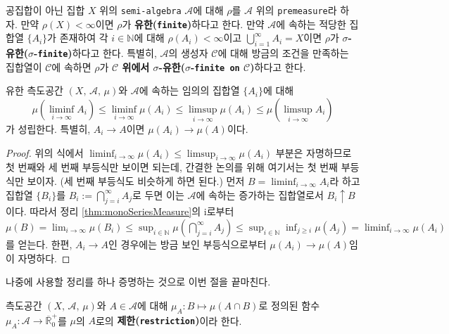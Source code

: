 \begin{definition}
    공집합이 아닌 집합 $X$ 위의 \texttt{semi-algebra} $\mathcal{A}$에 대해 $\rho$를 $\mathcal{A}$ 위의 \texttt{premeasure}라 하자. 만약 $\rho(X)<\infty$이면 $\rho$가 \textbf{유한(\texttt{finite})}하다고 한다. 만약 $\mathcal{A}$에 속하는 적당한 집합열 $\{A_i\}$가 존재하여 각 $i\in\mathbb{N}$에 대해 $\rho(A_i)<\infty$이고 $\bigcup_{i=1}^\infty A_i=X$이면 $\rho$가 \textbf{$\sigma$-유한($\sigma$-\texttt{finite})}하다고 한다. 특별히, $\mathcal{A}$의 생성자 $\mathcal{C}$에 대해 방금의 조건을 만족하는 집합열이 $\mathcal{C}$에 속하면 $\rho$가 \textbf{$\mathcal{C}$ 위에서 $\sigma$-유한($\sigma$-\texttt{finite on} $\mathcal{C}$)}하다고 한다.
\end{definition}

\begin{theorem}\label{thm:generalSeriesMeasure}
    유한 측도공간 $(X,\,\mathcal{A},\,\mu)$와 $\mathcal{A}$에 속하는 임의의 집합열 $\{A_i\}$에 대해
    \begin{equation*}
        \mu(\liminf_{i\to\infty} A_i)\leq\liminf_{i\to\infty}\mu(A_i)\leq\limsup_{i\to\infty}\mu(A_i)\leq\mu(\limsup_{i\to\infty}A_i)
    \end{equation*}
    가 성립한다. 특별히, $A_i\to A$이면 $\mu(A_i)\to\mu(A)$이다.
\end{theorem}

\begin{proof}
    위의 식에서 $\liminf_{i\to\infty}\mu(A_i)\leq\limsup_{i\to\infty}\mu(A_i)$ 부분은 자명하므로 첫 번째와 세 번째 부등식만 보이면 되는데, 간결한 논의를 위해 여기서는 첫 번째 부등식만 보이자. (세 번째 부등식도 비슷하게 하면 된다.) 먼저 $B=\liminf_{i\to\infty} A_i$라 하고 집합열 $\{B_i\}$를 $B_i:=\bigcap_{j=i}^\infty A_j$로 두면 이는 $\mathcal{A}$에 속하는 증가하는 집합열로서 $B_i\uparrow B$이다. 따라서 정리 \ref{thm:monoSeriesMeasure}의 i로부터 $\mu(B)=\lim_{i\to\infty}\mu(B_i)\leq\sup_{i\in\mathbb{N}}\mu(\bigcap_{j=i}^\infty A_j)\leq\sup_{i\in\mathbb{N}}\inf_{j\geq i}\mu(A_j)=\liminf_{i\to\infty}\mu(A_i)$를 얻는다. 한편, $A_i\to A$인 경우에는 방금 보인 부등식으로부터 $\mu(A_i)\to\mu(A)$임이 자명하다.
\end{proof}

나중에 사용할 정리를 하나 증명하는 것으로 이번 절을 끝마친다.

\begin{definition}
    측도공간 $(X,\,\mathcal{A},\,\mu)$와 $A\in\mathcal{A}$에 대해 $\mu_A:B\mapsto\mu(A\cap B)$로 정의된 함수 $\mu_A:\mathcal{A}\to\overline{\mathbb{R}}^+_0$를 $\mu$의 $A$로의 \textbf{제한(\texttt{restriction})}이라 한다.
\end{definition}

